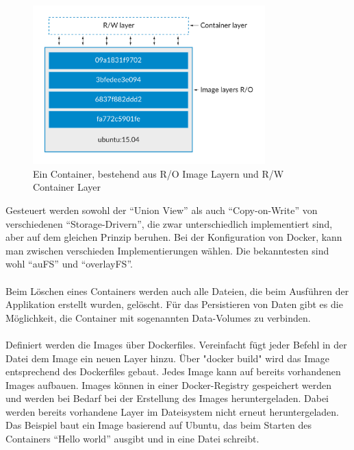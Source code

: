 \begin{figure}[!ht]
  \centering
  \includegraphics[width=0.8\textwidth]{images/11-docker-container.png}
  \caption{Ein Container, bestehend aus R/O Image Layern und R/W Container Layer \cite{docker:images}}
\end{figure}

Gesteuert werden sowohl der “Union View” als auch “Copy-on-Write” von verschiedenen “Storage-Drivern”, die zwar unterschiedlich implementiert sind, aber auf dem gleichen Prinzip beruhen. Bei der Konfiguration von Docker, kann man zwischen verschieden Implementierungen wählen. Die bekanntesten sind wohl “auFS” und “overlayFS”.

\paragraph{}
Beim Löschen  eines Containers werden auch alle Dateien, die beim Ausführen der Applikation erstellt wurden, gelöscht. Für das Persistieren von Daten gibt es die Möglichkeit, die Container mit sogenannten Data-Volumes zu verbinden.

\paragraph{}
Definiert werden die Images über Dockerfiles. Vereinfacht fügt jeder Befehl in der Datei dem Image ein neuen Layer hinzu. Über "docker build" wird das Image entsprechend des Dockerfiles gebaut. Jedes Image kann auf bereits vorhandenen Images aufbauen. Images können in einer Docker-Registry gespeichert werden und werden bei Bedarf bei der Erstellung des Images heruntergeladen. Dabei werden bereits vorhandene Layer im Dateisystem nicht erneut heruntergeladen. Das Beispiel baut ein Image basierend auf Ubuntu, das beim Starten des Containers “Hello world” ausgibt und in eine Datei schreibt.\\

